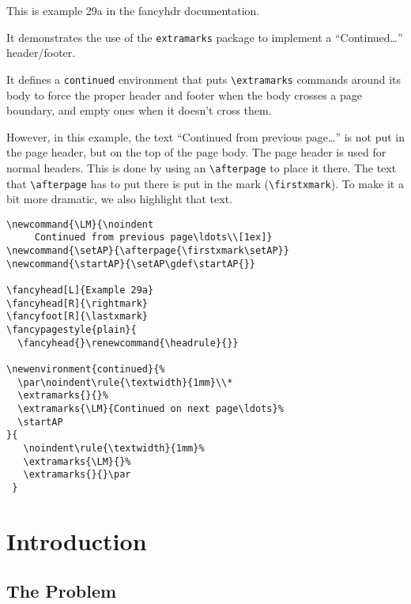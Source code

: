 \documentclass{report}
\newcommand{\LM}{\noindent\hl{Continued from previous page\ldots}\\[1ex]}
\newcommand{\setAP}{\afterpage{\firstxmark\setAP}}
\newcommand{\startAP}{\setAP\gdef\startAP{}}
\begin{document}
\tableofcontents

\thispagestyle{plain}
\noindent
\begin{boxedminipage}{\textwidth}
This is example 29a in the fancyhdr documentation.

It demonstrates the use of the \texttt{extramarks} package to implement
a ``Continued\ldots'' header/footer.

It defines a \texttt{continued} environment that puts \verb|\extramarks| commands around its body to force the proper header and footer when the body crosses a page boundary, and empty ones when it doesn't cross them.

However, in this example, the text ``Continued from previous page\ldots'' is not put in the page header, but on the top of the page body. The page header is used for normal headers. This is done by using an \verb|\afterpage| to place it there. The text that \verb|\afterpage| has to put there is put in the mark (\verb|\firstxmark|). To make it a bit more dramatic, we also highlight that text.

\begin{verbatim}
\newcommand{\LM}{\noindent
     Continued from previous page\ldots\\[1ex]}
\newcommand{\setAP}{\afterpage{\firstxmark\setAP}}
\newcommand{\startAP}{\setAP\gdef\startAP{}}

\fancyhead[L]{Example 29a}
\fancyhead[R]{\rightmark}
\fancyfoot[R]{\lastxmark}
\fancypagestyle{plain}{
  \fancyhead{}\renewcommand{\headrule}{}}

\newenvironment{continued}{%
  \par\noindent\rule{\textwidth}{1mm}\\*
  \extramarks{}{}%
  \extramarks{\LM}{Continued on next page\ldots}%
  \startAP
}{
   \noindent\rule{\textwidth}{1mm}%
   \extramarks{\LM}{}%
   \extramarks{}{}\par
 }
\end{verbatim}

\end{boxedminipage}

\pagestyle{fancy}

\newpage
{}
\chapter{Introduction}

\lipsum[1-4]

\section{The Problem}
\label{sec:problem}
\end{document}
